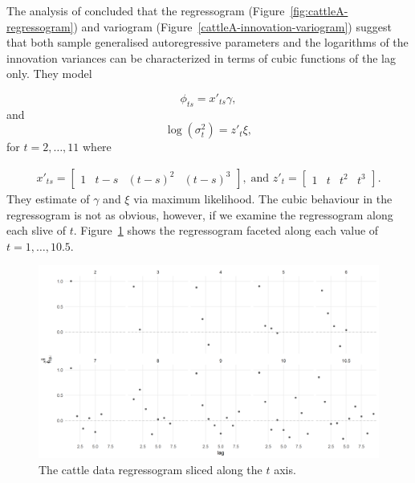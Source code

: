 \documentclass[12pt]{article}
\theoremstyle{definition}
\begin{document}
The analysis of \citet{pourahmadi1999joint} concluded that the regressogram (Figure~\ref{fig:cattleA-regressogram}) and variogram (Figure~\ref{cattleA-innovation-variogram}) suggest that both sample generalised autoregressive parameters and the logarithms of the innovation variances can be characterized in terms of cubic functions of the lag only. They model 

\[
\phi_{ts} = x'_{ts}\gamma, 
\]
\noindent
and
\[
\log\left(\sigma_t^2\right) = z'_{t}\xi, 
\]
for $t = 2,\dots, 11$ where 

\begin{align*}
x'_{ts} = \begin{bmatrix} 1 & t - s& \left(t - s\right)^2 & \left(t - s\right)^3 \end{bmatrix},\; \mbox{and } z'_{t} = \begin{bmatrix} 1 & t& t^2& t^3 \end{bmatrix}.
\end{align*}
\noindent
They estimate of $\gamma$ and $\xi$ via maximum likelihood. The cubic behaviour in the regressogram is not as obvious, however, if we examine the regressogram along each slive of $t$. Figure~\ref{fig:cattleA-smoothed-regressogram-smoothed-by-t} shows the regressogram faceted along each value of $t = 1,\dots, 10.5$. 


\begin{figure}[h] \label{fig:cattleA-smoothed-regressogram-smoothed-by-t}
\begin{center}
\includegraphics[width = \textwidth]{img/cattle/cattleA-smoothed-regressogram-smoothed-by-t}
\end{center}
 \caption{The cattle data regressogram sliced along the $t$ axis.}
\end{figure} 
\end{document}

